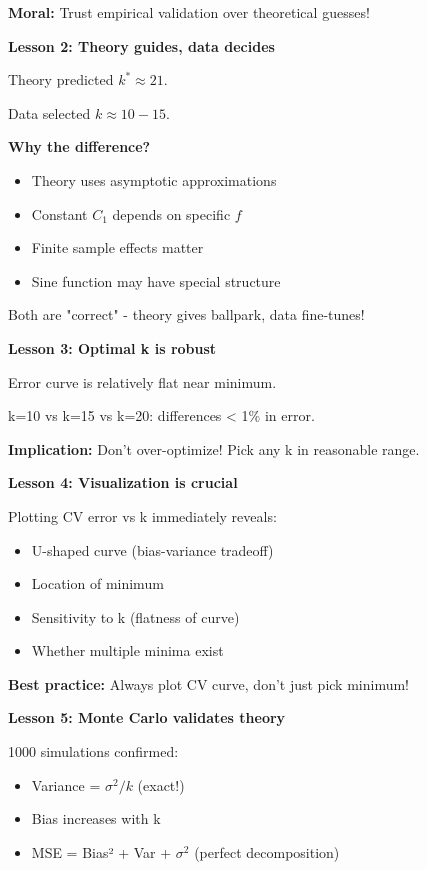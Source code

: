 \documentclass[12pt]{article}
\begin{document}
\begin{explanation}
\textbf{Moral:} Trust empirical validation over theoretical guesses!

\textbf{Lesson 2: Theory guides, data decides}

Theory predicted $k^* \approx 21$.

Data selected $k \approx 10-15$.

\textbf{Why the difference?}

\begin{itemize}
    \item Theory uses asymptotic approximations
    \item Constant $C_1$ depends on specific $f$
    \item Finite sample effects matter
    \item Sine function may have special structure
\end{itemize}

Both are "correct" - theory gives ballpark, data fine-tunes!

\textbf{Lesson 3: Optimal k is robust}

Error curve is relatively flat near minimum.

k=10 vs k=15 vs k=20: differences < 1\% in error.

\textbf{Implication:} Don't over-optimize! Pick any k in reasonable range.

\textbf{Lesson 4: Visualization is crucial}

Plotting CV error vs k immediately reveals:
\begin{itemize}
    \item U-shaped curve (bias-variance tradeoff)
    \item Location of minimum
    \item Sensitivity to k (flatness of curve)
    \item Whether multiple minima exist
\end{itemize}

\textbf{Best practice:} Always plot CV curve, don't just pick minimum!

\textbf{Lesson 5: Monte Carlo validates theory}

1000 simulations confirmed:
\begin{itemize}
    \item Variance = $\sigma^2/k$ (exact!)
    \item Bias increases with k
    \item MSE = Bias² + Var + $\sigma^2$ (perfect decomposition)
\end{itemize}


\end{explanation}
\end{document}
